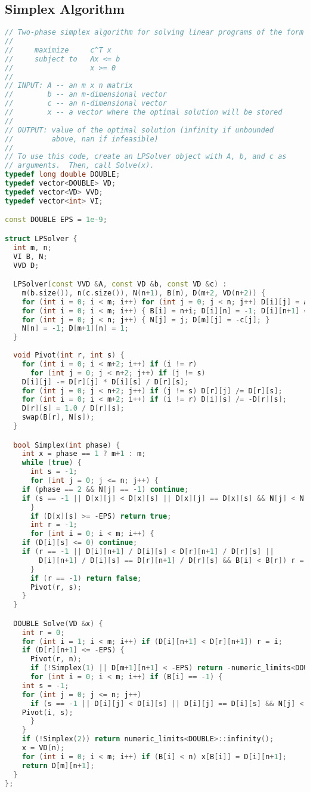 \subsection{Simplex Algorithm}
\begin{lstlisting}[language=C++]
// Two-phase simplex algorithm for solving linear programs of the form
//
//     maximize     c^T x
//     subject to   Ax <= b
//                  x >= 0
//
// INPUT: A -- an m x n matrix
//        b -- an m-dimensional vector
//        c -- an n-dimensional vector
//        x -- a vector where the optimal solution will be stored
//
// OUTPUT: value of the optimal solution (infinity if unbounded
//         above, nan if infeasible)
//
// To use this code, create an LPSolver object with A, b, and c as
// arguments.  Then, call Solve(x).
typedef long double DOUBLE;
typedef vector<DOUBLE> VD;
typedef vector<VD> VVD;
typedef vector<int> VI;

const DOUBLE EPS = 1e-9;

struct LPSolver {
  int m, n;
  VI B, N;
  VVD D;

  LPSolver(const VVD &A, const VD &b, const VD &c) : 
    m(b.size()), n(c.size()), N(n+1), B(m), D(m+2, VD(n+2)) {
    for (int i = 0; i < m; i++) for (int j = 0; j < n; j++) D[i][j] = A[i][j];
    for (int i = 0; i < m; i++) { B[i] = n+i; D[i][n] = -1; D[i][n+1] = b[i]; }
    for (int j = 0; j < n; j++) { N[j] = j; D[m][j] = -c[j]; }
    N[n] = -1; D[m+1][n] = 1;
  }
	   
  void Pivot(int r, int s) {
    for (int i = 0; i < m+2; i++) if (i != r)
      for (int j = 0; j < n+2; j++) if (j != s)
	D[i][j] -= D[r][j] * D[i][s] / D[r][s];
    for (int j = 0; j < n+2; j++) if (j != s) D[r][j] /= D[r][s];
    for (int i = 0; i < m+2; i++) if (i != r) D[i][s] /= -D[r][s];
    D[r][s] = 1.0 / D[r][s];
    swap(B[r], N[s]);
  }

  bool Simplex(int phase) {
    int x = phase == 1 ? m+1 : m;
    while (true) {
      int s = -1;
      for (int j = 0; j <= n; j++) {
	if (phase == 2 && N[j] == -1) continue;
	if (s == -1 || D[x][j] < D[x][s] || D[x][j] == D[x][s] && N[j] < N[s]) s = j;
      }
      if (D[x][s] >= -EPS) return true;
      int r = -1;
      for (int i = 0; i < m; i++) {
	if (D[i][s] <= 0) continue;
	if (r == -1 || D[i][n+1] / D[i][s] < D[r][n+1] / D[r][s] ||
	    D[i][n+1] / D[i][s] == D[r][n+1] / D[r][s] && B[i] < B[r]) r = i;
      }
      if (r == -1) return false;
      Pivot(r, s);
    }
  }

  DOUBLE Solve(VD &x) {
    int r = 0;
    for (int i = 1; i < m; i++) if (D[i][n+1] < D[r][n+1]) r = i;
    if (D[r][n+1] <= -EPS) {
      Pivot(r, n);
      if (!Simplex(1) || D[m+1][n+1] < -EPS) return -numeric_limits<DOUBLE>::infinity();
      for (int i = 0; i < m; i++) if (B[i] == -1) {
	int s = -1;
	for (int j = 0; j <= n; j++) 
	  if (s == -1 || D[i][j] < D[i][s] || D[i][j] == D[i][s] && N[j] < N[s]) s = j;
	Pivot(i, s);
      }
    }
    if (!Simplex(2)) return numeric_limits<DOUBLE>::infinity();
    x = VD(n);
    for (int i = 0; i < m; i++) if (B[i] < n) x[B[i]] = D[i][n+1];
    return D[m][n+1];
  }
};


\end{lstlisting}
